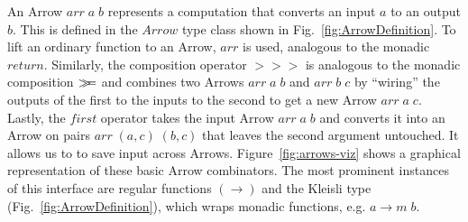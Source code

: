 \documentclass{jfp1}
\newcommand{\Conid}[1]{\mathit{#1}}
\newcommand{\Varid}[1]{\mathit{#1}}
\newcommand{\bind}{\mathbin{>\!\!\!>\mkern-6.7mu=}}
\begin{document}
An Arrow \ensuremath{\Varid{arr}\;\Varid{a}\;\Varid{b}} represents a computation that converts an input \ensuremath{\Varid{a}} to an output \ensuremath{\Varid{b}}. This is defined in the \ensuremath{\Conid{Arrow}} type class shown in Fig.~\ref{fig:ArrowDefinition}.
%
To lift an ordinary function to an Arrow, \ensuremath{\Varid{arr}} is used, analogous to the monadic \ensuremath{\Varid{return}}. Similarly, the composition operator \ensuremath{\mathbin{>\!\!>\!\!>}} is analogous to the monadic composition \ensuremath{\bind } and combines two Arrows \ensuremath{\Varid{arr}\;\Varid{a}\;\Varid{b}} and \ensuremath{\Varid{arr}\;\Varid{b}\;\Varid{c}} by \enquote{wiring} the outputs of the first to the inputs to the second to get a new Arrow \ensuremath{\Varid{arr}\;\Varid{a}\;\Varid{c}}. Lastly, the \ensuremath{\Varid{first}} operator takes the input Arrow \ensuremath{\Varid{arr}\;\Varid{a}\;\Varid{b}} and converts it into an Arrow on pairs \ensuremath{\Varid{arr}\;(\Varid{a},\Varid{c})\;(\Varid{b},\Varid{c})} that leaves the second argument untouched. It allows us to to save input across Arrows. Figure~\ref{fig:arrows-viz} shows a graphical representation of these basic Arrow combinators.
The most prominent instances of this interface are regular functions \ensuremath{(\to )}
and the Kleisli type (Fig.~\ref{fig:ArrowDefinition}), which wraps monadic functions, e.g.  \ensuremath{\Varid{a}\to \Varid{m}\;\Varid{b}}.
\end{document}
